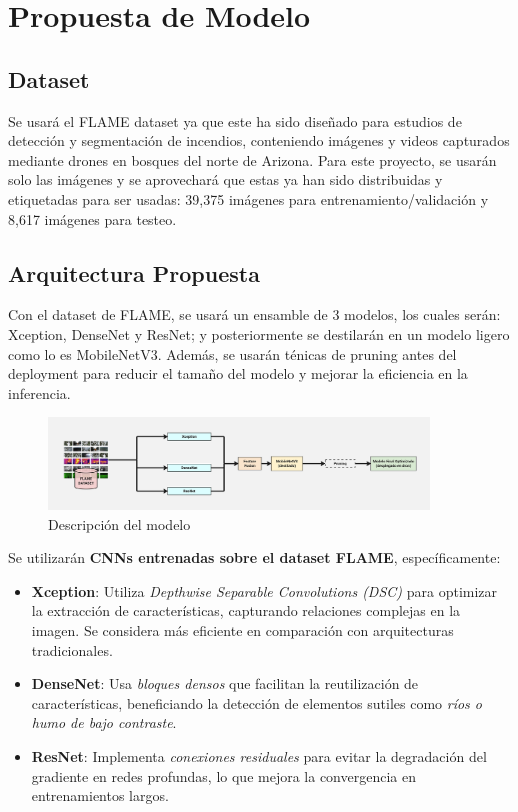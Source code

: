\section{Propuesta de Modelo}

\subsection{Dataset}
Se usará el FLAME dataset \cite{FLAME_Dataset} ya que este ha sido diseñado para estudios de
detección y segmentación de incendios, conteniendo imágenes y videos capturados mediante
drones en bosques del norte de Arizona. Para este proyecto, se usarán solo las imágenes y
se aprovechará que estas ya han sido distribuidas y etiquetadas para ser usadas:
39,375 imágenes para entrenamiento/validación y 8,617 imágenes para testeo.

\subsection{Arquitectura Propuesta}
Con el dataset de FLAME, se usará un ensamble de 3 modelos, los cuales serán: Xception,
DenseNet y ResNet; y posteriormente se destilarán en un modelo ligero como lo es
MobileNetV3. Además, se usarán ténicas de pruning antes del deployment para reducir
el tamaño del modelo y mejorar la eficiencia en la inferencia.

\begin{figure}[h]
    \centering
    \includegraphics[width=0.9\textwidth]{images/model}
    \caption{Descripción del modelo}
    \label{fig:model}
\end{figure}

Se utilizarán \textbf{CNNs entrenadas sobre el dataset FLAME}, específicamente:

\begin{itemize}
    \item \textbf{Xception}: Utiliza \textit{Depthwise Separable Convolutions (DSC)} para optimizar la extracción de características, capturando relaciones complejas en la imagen. Se considera más eficiente en comparación con arquitecturas tradicionales.
    \item \textbf{DenseNet}: Usa \textit{bloques densos} que facilitan la reutilización de características, beneficiando la detección de elementos sutiles como \textit{ríos o humo de bajo contraste}.
    \item \textbf{ResNet}: Implementa \textit{conexiones residuales} para evitar la degradación del gradiente en redes profundas, lo que mejora la convergencia en entrenamientos largos.
\end{itemize}

